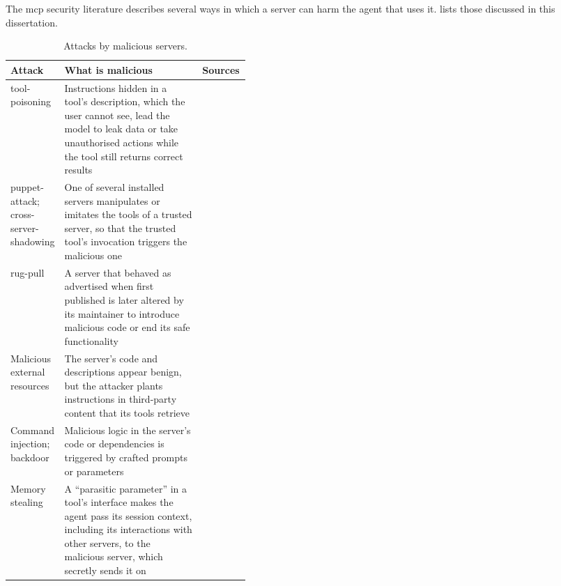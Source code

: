 The \gls{mcp} security literature describes several ways in which a server can harm the agent that uses it.  lists those discussed in this dissertation.

\begin{table}[tb]
  \centering
  \caption{Attacks by malicious  servers.}\label{tab:mcp-attacks}
  \small
  \begin{tabularx}{\linewidth}{>{\raggedright\arraybackslash}p{0.2\linewidth} >{\raggedright\arraybackslash}X >{\raggedright\arraybackslash}p{0.2\linewidth}}
    \toprule
    Attack & What is malicious & Sources \\
    \midrule
    \Gls{tool-poisoning} & Instructions hidden in a tool's description, which the user cannot see, lead the model to leak data or take unauthorised actions while the tool still returns correct results & \cites[p.~2413]{Song2026}[p.~18]{Hou2026} \\
    \addlinespace
    \Gls{puppet-attack}; \gls{cross-server-shadowing} & One of several installed servers manipulates or imitates the tools of a trusted server, so that the trusted tool's invocation triggers the malicious one & \cites[p.~2413]{Song2026}[pp.~19--20]{Hou2026} \\
    \addlinespace
    \Gls{rug-pull} & A server that behaved as advertised when first published is later altered by its maintainer to introduce malicious code or end its safe functionality & \cites[p.~19]{Hou2026}[p.~2414]{Song2026} \\
    \addlinespace
    Malicious external resources & The server's code and descriptions appear benign, but the attacker plants instructions in third-party content that its tools retrieve & \cite[p.~2414]{Song2026} \\
    \addlinespace
    Command injection; backdoor & Malicious logic in the server's code or dependencies is triggered by crafted prompts or parameters & \cite[p.~20]{Hou2026} \\
    \addlinespace
    Memory stealing & A \enquote{parasitic parameter} in a tool's interface makes the agent pass its session context, including its interactions with other servers, to the malicious server, which secretly sends it on & \cite[p.~177]{Sun2025} \\
    \bottomrule
  \end{tabularx}
\end{table}

